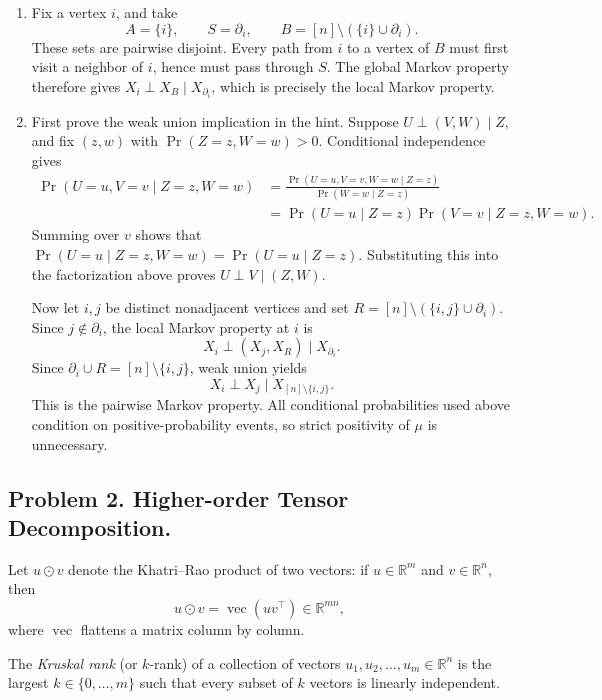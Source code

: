 \documentclass[12pt]{article}
\theoremstyle{plain}
\theoremstyle{definition}
\begin{document}
\vspace{1em}
\newline 
\begin{enumerate}
    \item Fix a vertex \(i\), and take
    \[
    A=\{i\},\qquad S=\partial_i,\qquad
    B=[n]\setminus(\{i\}\cup\partial_i).
    \]
    These sets are pairwise disjoint. Every path from \(i\) to a
    vertex of \(B\) must first visit a neighbor of \(i\), hence must
    pass through \(S\). The global Markov property therefore gives
    \(X_i\perp X_B\mid X_{\partial_i}\), which is precisely the
    local Markov property.

    \item First prove the weak union implication in the hint. Suppose
    \(U\perp(V,W)\mid Z\), and fix \((z,w)\) with
    \(\Pr(Z=z,W=w)>0\). Conditional independence gives
    \begin{align*}
    \Pr(U=u,V=v\mid Z=z,W=w)
    &=\frac{\Pr(U=u,V=v,W=w\mid Z=z)}
            {\Pr(W=w\mid Z=z)}\\
    &=\Pr(U=u\mid Z=z)\Pr(V=v\mid Z=z,W=w).
    \end{align*}
    Summing over \(v\) shows that
    \(\Pr(U=u\mid Z=z,W=w)=\Pr(U=u\mid Z=z)\).
    Substituting this into the factorization above proves
    \(U\perp V\mid(Z,W)\).

    Now let \(i,j\) be distinct nonadjacent vertices and set
    \(R=[n]\setminus(\{i,j\}\cup\partial_i)\).
    Since \(j\notin\partial_i\), the local Markov property at \(i\)
    is
    \[
    X_i\perp(X_j,X_R)\mid X_{\partial_i}.
    \]
    Since \(\partial_i\cup R=[n]\setminus\{i,j\}\), weak union yields
    \[
    X_i\perp X_j\mid X_{[n]\setminus\{i,j\}}.
    \]
    This is the pairwise Markov property. All conditional probabilities
    used above condition on positive-probability events, so strict
    positivity of \(\mu\) is unnecessary.
\end{enumerate}
\newpage

\subsection*{Problem 2. Higher-order Tensor Decomposition.}
Let \(u \odot v\) denote the Khatri--Rao product of two vectors:
if \(u \in \mathbb{R}^m\) and \(v \in \mathbb{R}^n\), then
\[
u \odot v = \operatorname{vec}(uv^\top) \in \mathbb{R}^{mn},
\]
where \(\operatorname{vec}\) flattens a matrix column by column.

The \emph{Kruskal rank} (or \(k\)-rank) of a collection
of vectors \(u_1,u_2,\ldots,u_m \in \mathbb{R}^n\) is the largest
\(k\in \{0,\dots,m\}\) such that every subset of \(k\) vectors is linearly independent.
\end{document}
